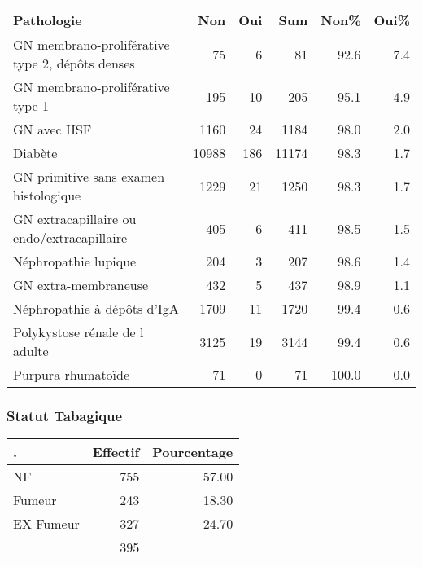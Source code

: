 \documentclass[11pt,a4paper]{article}\usepackage[]{graphicx}\usepackage[]{color}
\begin{document}
\begin{table}[H]
\centering
\begin{tabular}{lrrrrr}
  \hline
Pathologie & Non & Oui & Sum & Non\% & Oui\% \\ 
  \hline
GN membrano-proliférative type 2, dépôts denses & 75 &  6 & 81 & 92.6 & 7.4 \\ 
  GN membrano-proliférative type 1 & 195 & 10 & 205 & 95.1 & 4.9 \\ 
  GN avec HSF & 1160 & 24 & 1184 & 98.0 & 2.0 \\ 
  Diabète & 10988 & 186 & 11174 & 98.3 & 1.7 \\ 
  GN primitive sans examen histologique & 1229 & 21 & 1250 & 98.3 & 1.7 \\ 
  GN extracapillaire ou endo/extracapillaire & 405 &  6 & 411 & 98.5 & 1.5 \\ 
  Néphropathie lupique & 204 &  3 & 207 & 98.6 & 1.4 \\ 
  GN extra-membraneuse & 432 &  5 & 437 & 98.9 & 1.1 \\ 
  Néphropathie à dépôts d'IgA & 1709 & 11 & 1720 & 99.4 & 0.6 \\ 
  Polykystose rénale de l adulte & 3125 & 19 & 3144 & 99.4 & 0.6 \\ 
  Purpura rhumatoïde & 71 &  0 & 71 & 100.0 & 0.0 \\ 
   \hline
\end{tabular}
\end{table}


    \subsubsection{Statut Tabagique}

\begin{table}[ht]
\centering
\begin{tabular}{lrr}
  \hline
. & Effectif & Pourcentage \\ 
  \hline
NF & 755 & 57.00 \\ 
  Fumeur & 243 & 18.30 \\ 
  EX Fumeur & 327 & 24.70 \\ 
   & 395 &  \\ 
   \hline
\end{tabular}
\end{table}
\end{document}
